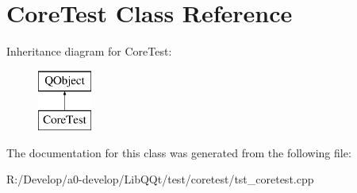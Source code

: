 \hypertarget{class_core_test}{}\section{Core\+Test Class Reference}
\label{class_core_test}
Inheritance diagram for Core\+Test\+:\begin{figure}[H]
\begin{center}
\leavevmode
\includegraphics[height=2.000000cm]{class_core_test}
\end{center}
\end{figure}


The documentation for this class was generated from the following file\+:\begin{DoxyCompactItemize}
\item 
R\+:/\+Develop/a0-\/develop/\+Lib\+Q\+Qt/test/coretest/tst\+\_\+coretest.\+cpp\end{DoxyCompactItemize}
